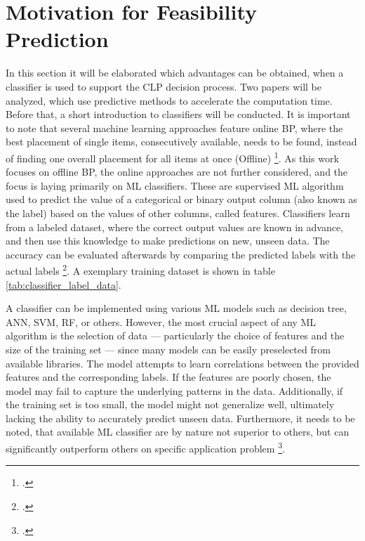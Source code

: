 \chapter{Motivation for Feasibility Prediction}
\label{sec:motivation_feasibility_prediction}
In this section it will be elaborated which advantages can be obtained, when
a classifier is used to support the \gls{CLP} decision process. Two papers will be
analyzed, which use predictive methods to accelerate the computation time. Before that,
a short introduction to classifiers will be conducted. It is important to note that
several machine learning approaches feature
online \gls{BP}, where the best placement of single items, consecutively available,
needs to be found, instead of finding one overall placement for all items at once
(Offline) \footcite[cf.][p. 1]{ali_-line_2022}. As this work focuses on offline
\gls{BP}, the online approaches are not further considered, and the focus is laying
primarily on \gls{ML} classifiers. These are supervised \gls{ML} algorithm used to predict the
value of a categorical or binary output column (also known as the label) based on the
values of other columns, called features. Classifiers learn from a labeled dataset,
where the correct output values are known in advance, and then use this knowledge to
make predictions on new, unseen data. The accuracy can be evaluated afterwards by comparing
the predicted labels with the actual labels \footcite[cf.][]{kotsiantis_supervised_2007}.
A exemplary training dataset is shown in table \ref{tab:classifier_label_data}.



A classifier can be implemented using various \gls{ML} models such as decision tree,
\gls{ANN}, \gls{SVM}, \gls{RF}, or others. However, the most crucial aspect of any
\gls{ML} algorithm is the selection of data — particularly the choice of features and
the size of the training set — since many models can be easily preselected from available
libraries. The model attempts to learn correlations between the provided features
and the corresponding labels. If the features are poorly chosen, the model may fail
to capture the underlying patterns in the data. Additionally, if the training set
is too small, the model might not generalize well, ultimately lacking the ability
to accurately predict unseen data. Furthermore, it needs to be noted, that available
\gls{ML} classifier are by nature not superior to others, but can significantly outperform
others on specific application problem \footcite[cf.][pp. 250, 264]{kotsiantis_supervised_2007}.


